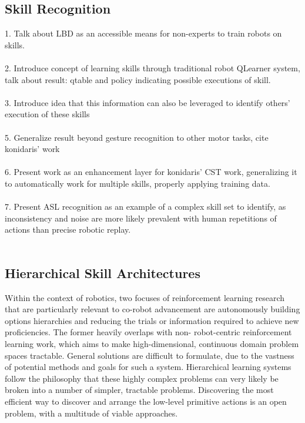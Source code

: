 \documentclass[letterpaper]{article}
\begin{document}
\subsection{Skill Recognition}
1. Talk about LBD as an accessible means for non-experts to train robots on skills.\\
\\
2. Introduce concept of learning skills through traditional robot QLearner system, talk about
   result: qtable and policy indicating possible executions of skill.\\
\\
3. Introduce idea that this information can also be leveraged to identify others' execution of these skills\\
\\
5. Generalize result beyond gesture recognition to other motor tasks, cite konidaris' work\\
\\
6. Present work as an enhancement layer for konidaris' CST work, generalizing it to automatically work for
 multiple skills, properly applying training data.\\
\\
7. Present ASL recognition as an example of a complex skill set to identify, as inconsistency and noise
   are more likely prevalent with human repetitions of actions than precise robotic replay.\\
\\


\subsection{Hierarchical Skill Architectures}
Within the context of robotics, two focuses of reinforcement learning research that are particularly relevant to co-robot advancement are autonomously building options hierarchies and reducing the trials or information required to achieve new proficiencies. The former heavily overlaps with non- robot-centric reinforcement learning work, which aims to make high-dimensional, continuous domain problem spaces tractable. General solutions are difficult to formulate, due to the vastness of potential methods and goals for such a system. Hierarchical learning systems follow the philosophy that these highly complex problems can very likely be broken into a number of simpler, tractable problems. Discovering the most efficient way to discover and arrange the low-level primitive actions is an open problem, with a multitude of viable approaches\cite{EfficientSkillLearning,AutoHierarchyLearning,LearningHierarchicalControl}.
\end{document}

